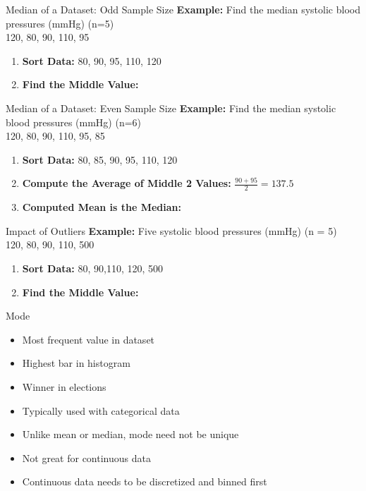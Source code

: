 \documentclass[10pt,dvipsnames, aspectratio=169]{beamer}
\begin{document}
\begin{frame}[t]{Median of a Dataset: Odd Sample Size}
	\textbf{Example:} Find the median systolic blood pressures (mmHg) (n=5) \\ 
	120, 80, 90, 110, 95 \pause 
	\begin{enumerate}
		\item \textbf{Sort Data:}  80, 90, 95, 110, 120  \pause 
		\item \textbf{Find the Middle Value:}  
	\end{enumerate}
\end{frame}


\begin{frame}[t]{Median of a Dataset: Even Sample Size}
	\textbf{Example:} Find the median systolic blood pressures (mmHg) (n=6) \\ 
	120, 80, 90, 110, 95, 85 \pause 
	\begin{enumerate}
		\item \textbf{Sort Data:}  80, 85, 90, 95, 110, 120  \pause 
		\item \textbf{Compute the Average of Middle 2 Values:}  
		$\frac{90+95}{2} = 137.5 $ \pause 
		\item \textbf{Computed Mean is the Median:}  
	\end{enumerate}
\end{frame}


\begin{frame}[t]{Impact of Outliers}
	\textbf{Example:} Five systolic blood pressures (mmHg) (n = 5) \\ 
	120, 80, 90, 110, 500 \pause 
	\begin{enumerate}
		\item \textbf{Sort Data:}  80, 90,110, 120, 500  \pause 
		\item \textbf{Find the Middle Value:}  
	\end{enumerate}
\end{frame}

\begin{frame}[t]{Mode}
	\begin{itemize}
		\item Most frequent value in dataset
		\item Highest bar in histogram
		\item Winner in elections
		\item Typically used with categorical data
		\item Unlike mean or median, mode need not
		be unique
		\item Not great for continuous data
		\item Continuous data needs to be discretized
		and binned first
	\end{itemize}
\end{frame}
\end{document}
